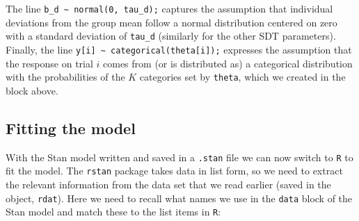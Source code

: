 \documentclass[
  english,
  ,man,floatsintext]{apa6}
\newenvironment{Shaded}{\begin{snugshade}}{\end{snugshade}}
\newcommand{\CommentTok}[1]{\textcolor[rgb]{0.56,0.35,0.01}{\textit{#1}}}
\newcommand{\DataTypeTok}[1]{\textcolor[rgb]{0.13,0.29,0.53}{#1}}
\newcommand{\DecValTok}[1]{\textcolor[rgb]{0.00,0.00,0.81}{#1}}
\newcommand{\KeywordTok}[1]{\textcolor[rgb]{0.13,0.29,0.53}{\textbf{#1}}}
\newcommand{\NormalTok}[1]{#1}
\newcommand{\OperatorTok}[1]{\textcolor[rgb]{0.81,0.36,0.00}{\textbf{#1}}}
\newcommand{\StringTok}[1]{\textcolor[rgb]{0.31,0.60,0.02}{#1}}
\begin{document}
The line \texttt{b\_d\ \textasciitilde{}\ normal(0,\ tau\_d);} captures the assumption that individual deviations from the group mean follow a normal distribution centered on zero with a standard deviation of \texttt{tau\_d} (similarly for the other SDT parameters). Finally, the line \texttt{y{[}i{]}\ \textasciitilde{}\ categorical(theta{[}i{]});} expresses the assumption that the response on trial \(i\) comes from (or is distributed as) a categorical distribution with the probabilities of the \(K\) categories set by \texttt{theta}, which we created in the block above.

\hypertarget{fitting-the-model}{%
\subsection{Fitting the model}\label{fitting-the-model}}

With the Stan model written and saved in a \texttt{.stan} file we can now switch to \texttt{R} to fit the model. The \texttt{rstan} package takes data in list form, so we need to extract the relevant information from the data set that we read earlier (saved in the object, \texttt{rdat}). Here we need to recall what names we use in the \texttt{data} block of the Stan model and match these to the list items in \texttt{R}:

\begin{Shaded}
\end{Shaded}
\end{document}
